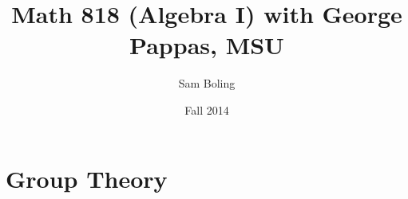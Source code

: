 \documentclass{report}
\title{Math 818 (Algebra I) with George Pappas, MSU}
\author{Sam Boling}
\date{Fall 2014}
\begin{document}
\maketitle

\chapter{Group Theory}







\end{document}
